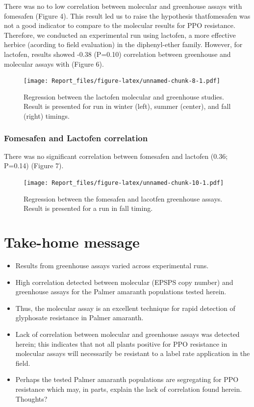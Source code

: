 \documentclass[]{article}
\begin{document}
There was no to low correlation between molecular and greenhouse assays
with fomesafen (Figure 4). This result led us to raise the hypothesis
thatfomesafen was not a good indicator to compare to the molecular
results for PPO resistance. Therefore, we conducted an experimental run
using lactofen, a more effective herbice (acording to field evaluation)
in the diphenyl-ether family. However, for lactofen, results showed
-0.38 (P=0.10) correlation between greenhouse and molecular assays with
(Figure 6).

\begin{figure}
\centering
\texttt{[image: Report\_files/figure-latex/unnamed-chunk-8-1.pdf]}
\caption{Regression between the lactofen molecular and greenhouse
studies. Result is presented for run in winter (left), summer (center),
and fall (right) timings.}
\end{figure}

\subsubsection{Fomesafen and Lactofen
correlation}\label{fomesafen-and-lactofen-correlation}

There was no significant correlation between fomesafen and lactofen
(0.36; P=0.14) (Figure 7).

\begin{figure}
\centering
\texttt{[image: Report\_files/figure-latex/unnamed-chunk-10-1.pdf]}
\caption{Regression between the fomesafen and lacotfen greenhouse
assays. Result is presented for a run in fall timing.}
\end{figure}

\section{Take-home message}\label{take-home-message}

\begin{itemize}
\item
  Results from greenhouse assays varied across experimental runs.
\item
  High correlation detected between molecular (EPSPS copy number) and
  greenhouse assays for the Palmer amaranth populations tested herein.
\item
  Thus, the molecular assay is an excellent technique for rapid
  detection of glyphosate resistance in Palmer amaranth.
\item
  Lack of correlation between molecular and greenhouse assays was
  detected herein; this indicates that not all plants positive for PPO
  resistance in molecular assays will necessarily be resistant to a
  label rate application in the field.
\item
  Perhaps the tested Palmer amaranth populations are segregating for PPO
  resistance which may, in parts, explain the lack of correlation found
  herein. Thoughts?
\end{itemize}
\end{document}
